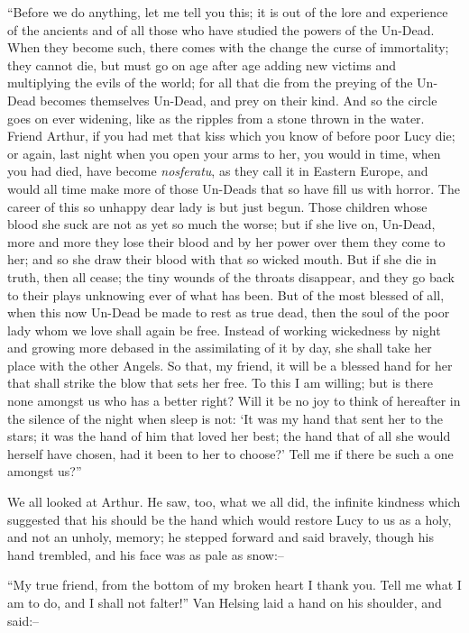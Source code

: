 \documentclass[12pt,openright]{book}
\begin{document}
“Before we do anything, let me tell you this; it is out of the lore and experience of the ancients and of all those who have studied the powers of the Un-Dead. When they become such, there comes with the change the curse of immortality; they cannot die, but must go on age after age adding new victims and multiplying the evils of the world; for all that die from the preying of the Un-Dead becomes themselves Un-Dead, and prey on their kind. And so the circle goes on ever widening, like as the ripples from a stone thrown in the water. Friend Arthur, if you had met that kiss which you know of before poor Lucy die; or again, last night when you open your arms to her, you would in time, when you had died, have become \textit{nosferatu}, as they call it in Eastern Europe, and would all time make more of those Un-Deads that so have fill us with horror. The career of this so unhappy dear lady is but just begun. Those children whose blood she suck are not as yet so much the worse; but if she live on, Un-Dead, more and more they lose their blood and by her power over them they come to her; and so she draw their blood with that so wicked mouth. But if she die in truth, then all cease; the tiny wounds of the throats disappear, and they go back to their plays unknowing ever of what has been. But of the most blessed of all, when this now Un-Dead be made to rest as true dead, then the soul of the poor lady whom we love shall again be free. Instead of working wickedness by night and growing more debased in the assimilating of it by day, she shall take her place with the other Angels. So that, my friend, it will be a blessed hand for her that shall strike the blow that sets her free. To this I am willing; but is there none amongst us who has a better right? Will it be no joy to think of hereafter in the silence of the night when sleep is not: ‘It was my hand that sent her to the stars; it was the hand of him that loved her best; the hand that of all she would herself have chosen, had it been to her to choose?’ Tell me if there be such a one amongst us?”

We all looked at Arthur. He saw, too, what we all did, the infinite kindness which suggested that his should be the hand which would restore Lucy to us as a holy, and not an unholy, memory; he stepped forward and said bravely, though his hand trembled, and his face was as pale as snow:–

“My true friend, from the bottom of my broken heart I thank you. Tell me what I am to do, and I shall not falter!” Van Helsing laid a hand on his shoulder, and said:–
\end{document}

